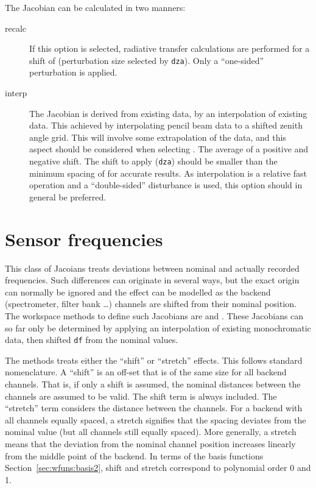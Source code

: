The Jacobian can be calculated in two manners:
\begin{description}
\item[recalc] If this option is selected, radiative transfer calculations are
  performed for a shift of  (perturbation size selected
  by \verb|dza|). Only a ``one-sided'' perturbation is applied.
\item[interp] The Jacobian is derived from existing data, by an interpolation
  of existing data. This achieved by interpolating pencil beam data to a
  shifted zenith angle grid. This will involve some extrapolation of the data,
  and this aspect should be considered when selecting
  . The average of a positive and negative shift.
  The shift to apply (\verb|dza|) should be smaller than the minimum spacing of
   for accurate results. As interpolation is a
  relative fast operation and a ``double-sided'' disturbance is used, this
  option should in general be preferred.
\end{description}




\section{Sensor frequencies}
\label{sec:wfuns:sensorfreq}

This class of Jacoians treats deviations between nominal and actually recorded
frequencies. Such differences can originate in several ways, but the exact
origin can normally be ignored and the effect can be modelled as the backend
(spectrometer, filter bank \dots) channels are shifted from their nominal
position. The workspace methods to define such Jacobians are
 and . These
Jacobians can so far only be determined by applying an interpolation of existing
monochromatic data, then shifted \verb|df| from the nominal
values.

The methods treats either the ``shift'' or ``stretch'' effects. This follows
standard nomenclature. A ``shift'' is an off-set that is of the same size for
all backend channels. That is, if only a shift is assumed, the nominal
distances between the channels are assumed to be valid. The shift term is
always included. The ``stretch'' term considers the distance between the
channels. For a backend with all channels equally spaced, a stretch signifies
that the spacing deviates from the nominal value (but all channels still
equally spaced). More generally, a stretch means that the deviation from the
nominal channel position increases linearly from the middle point of the
backend. In terms of the basis functions Section~\ref{sec:wfuns:basis2}, shift
and stretch correspond to polynomial order 0 and 1.

